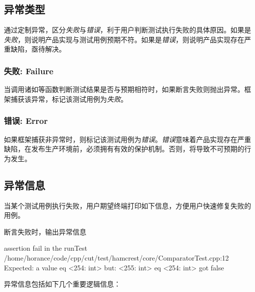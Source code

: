 \begin{content}

\subsection{异常类型}

通过定制异常，区分\emph{失败}与\emph{错误}，利于用户判断测试执行失败的具体原因。如果是\emph{失败}，则说明产品实现与测试用例预期不符。如果是\emph{错误}，则说明产品实现存在严重缺陷，亟待解决。

\subsubsection{失败: Failure}

当调用诸如等函数判断测试结果是否与预期相符时，如果断言失败则抛出异常。框架捕获该异常，标记该测试用例为\emph{失败}。

\subsubsection{错误: Error}

如果框架捕获非异常时，则标记该测试用例为\emph{错误}。\emph{错误}意味着产品实现存在严重缺陷，在发布生产环境前，必须拥有有效的保护机制。否则，将导致不可预期的行为发生。

\subsection{异常信息}

当某个测试用例执行失败，用户期望终端打印如下信息，方便用户快速修复失败的用例。

\begin{nodiff}{断言失败时，输出异常信息}
 \begin{c++}
assertion fail in the runTest
/home/horance/code/cpp/cut/test/hamcrest/core/ComparatorTest.cpp:12
Expected: a value eq <254: int>
     but: <255: int> eq <254: int> got false
 \end{c++}
\end{nodiff}

异常信息包括如下几个重要逻辑信息：


\end{content}
